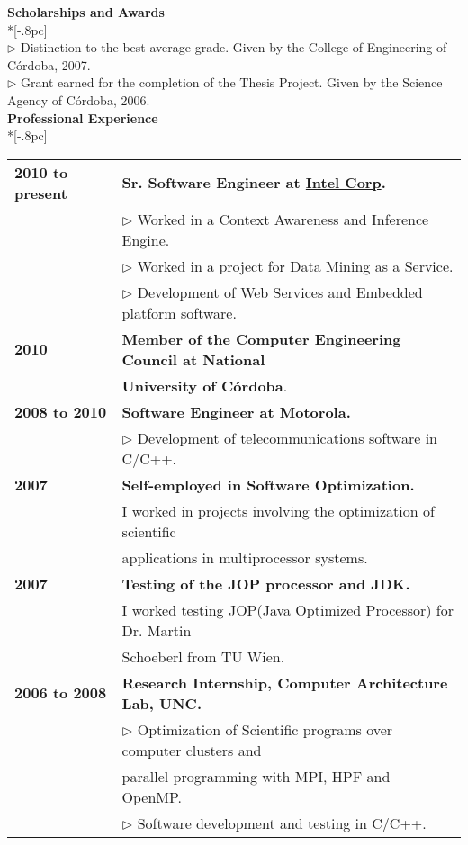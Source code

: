 \documentclass[letter,11pt,english]{article}
\begin{document}
{\bf Scholarships and Awards} \\*[-.8pc]
\underline{\hspace{6in}} \\
\renewcommand{\labelitemi}{}
$\triangleright$ Distinction to the best average grade.
Given by the College of Engineering of C\'ordoba, 2007.\\
$\triangleright$ Grant earned for the completion of the Thesis Project.
Given by the Science Agency of C\'ordoba, 2006.\\

\newpage
{\large \bf Professional Experience}\\*[-.8pc]
\underline{\hspace{6in}}
\\
\begin{tabular}{ p{3cm} l }
  {\bf 2010 to present} & {\bf Sr. Software Engineer at \href{http://www.intel.com}{Intel Corp}.}\\
                        & 	$\triangleright$ Worked in a Context Awareness and Inference Engine.\\ 
                        & 	$\triangleright$ Worked in a project for Data Mining as a Service.\\
                        & 	$\triangleright$ Development of Web Services and Embedded platform software.\\
  {\bf 2010}            & 	{\bf Member of the Computer Engineering Council at National}\\
                        &   {\bf University of C\'ordoba}.\\
  {\bf 2008 to 2010}    & 	{\bf Software Engineer at Motorola.}\\
                        & 	$\triangleright$ Development of telecommunications software in C/C++.\\ 
  {\bf 2007}            & 	{\bf Self-employed in Software Optimization.}\\
                        &	I worked in projects involving the optimization of scientific\\
                        &	applications in multiprocessor systems.\\            
  {\bf 2007}            & 	{\bf Testing of the JOP processor and JDK.}\\
                        & 	I worked testing JOP(Java Optimized Processor) for Dr. Martin\\
                        &   Schoeberl from TU Wien.\\
  {\bf 2006 to 2008}    & 	{\bf Research Internship, Computer Architecture Lab, UNC.}\\
                        & 	$\triangleright$ Optimization of Scientific programs over computer clusters and\\
                        & 	parallel programming with MPI, HPF and OpenMP.\\
                        & 	$\triangleright$ Software development and testing in C/C++.\\
                        
			
\end{tabular} 
\end{document}
